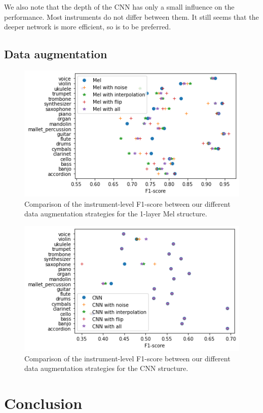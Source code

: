 \documentclass[final]{cvpr}
\begin{document}
We also note that the depth of the CNN has only a small influence on the performance. Most instruments do not differ between them. It still seems that the deeper network is more efficient, so is to be preferred.
\subsection{Data augmentation}


\begin{figure}
	\centering
	\includegraphics[scale = 0.5]{mel_data.png}
	\caption{Comparison of the instrument-level F1-score between our different data augmentation strategies for the 1-layer Mel structure.}
	\label{mel_data}
\end{figure}
\begin{figure}
	\centering
	\includegraphics[scale = 0.5]{cnn_data.png}
	\caption{Comparison of the instrument-level F1-score between our different data augmentation strategies for the CNN structure.}
	\label{cnn_data}
\end{figure}
\section{Conclusion}

{\small
	
	
}
\end{document}
